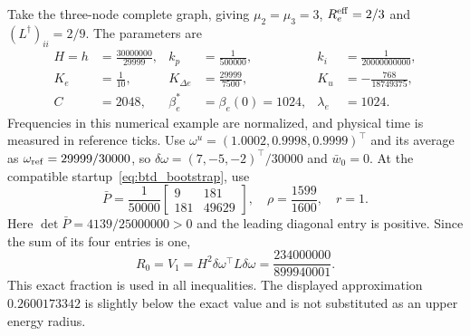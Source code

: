 Take the three-node complete graph, giving
$\mu_2=\mu_3=3$, $R_e^{\rm eff}=2/3$ and
$(L^\dagger)_{ii}=2/9$. The parameters are
\begin{align}
 H=h&=\frac{30000000}{29999},&k_p&=\frac1{500000},&k_i&=\frac1{20000000000},\nonumber\\
 K_e&=\frac1{10},&K_{\Delta e}&=\frac{29999}{7500},&K_u&=-\frac{768}{18749375},\nonumber\\
 C&=2048,&\beta^*_e&=\beta_e(0)=1024,&\lambda_e&=1024.
 \label{eq:btd_example_gains}
\end{align}
Frequencies in this numerical example are normalized, and physical time is measured in reference ticks. Use $\omega^u=(1.0002,0.9998,0.9999)^\top$ and its average as
$\omega_{\rm ref}=29999/30000$, so
$\delta\omega=(7,-5,-2)^\top/30000$ and $\bar w_0=0$.
At the compatible startup~\eqref{eq:btd_bootstrap}, use
\begin{equation}
 \bar P=\frac1{50000}\begin{bmatrix}9&181\\181&49629\end{bmatrix},
 \quad\rho=\frac{1599}{1600},\quad r=1.
 \label{eq:btd_witness}
\end{equation}
Here $\det\bar P=4139/25000000>0$ and the leading diagonal entry is
positive. Since the sum of its four entries is one,
\begin{equation}
 R_0=V_1=H^2\delta\omega^\top L\delta\omega
     =\frac{234000000}{899940001}.
 \label{eq:btd_d_R0}
\end{equation}
This exact fraction is used in all inequalities. The displayed approximation
$0.2600173342$ is slightly below the exact value and is not substituted as
an upper energy radius.

